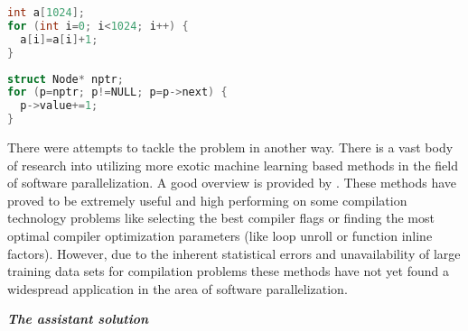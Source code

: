 \begin{description}[style=unboxed,leftmargin=0cm]
\begin{minipage}[t]{0.5\linewidth}
\begin{lstlisting}[caption={\raggedright Parallelizable loop operating on what is clear to compiler a \textbf{linear array}.},label={lst:introduction_array},language=C]
int a[1024];
for (int i=0; i<1024; i++) {
  a[i]=a[i]+1;
}
\end{lstlisting}
\end{minipage}
%
\begin{minipage}[t]{0.5\linewidth}
\begin{lstlisting}[caption={\raggedright Non-parallelizable loop operating on what programmer knows is a \textbf{linked-list}.},label={lst:introduction_list},language=C]
struct Node* nptr;
for (p=nptr; p!=NULL; p=p->next) {
  p->value+=1;
}
\end{lstlisting}
\end{minipage}
\item[\textit{Machine learning based parallelization applicability}] There were attempts to tackle the problem in another way. There is a vast body of research into utilizing more exotic machine learning based methods in the field of software parallelization. A good overview is provided by \cite{ml-oboyle}. These methods have proved to be extremely useful and high performing on some compilation technology problems like selecting the best compiler flags or finding the most optimal compiler optimization parameters (like loop unroll or function inline factors). However, due to the inherent statistical errors and unavailability of large training data sets for compilation problems these methods have not yet found a widespread application in the area of software parallelization.
\end{description}
\begin{center}
\textbf{\large \textit{The assistant solution}}
\end{center}
